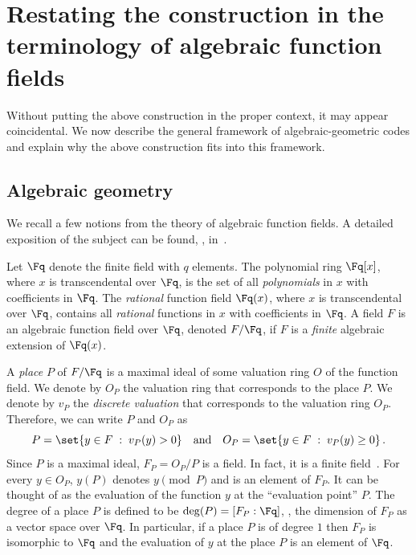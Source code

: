 \section{Restating the construction in the terminology of algebraic function fields}
\label{sec:Restating}

Without putting the above construction in the proper context, it may
appear coincidental. We now describe the general framework of
algebraic-geometric codes and explain why the above construction
fits into this framework.

\subsection{Algebraic geometry}\label{subsec:AG-prel}
We recall a few notions from the theory of algebraic function
fields. A detailed exposition of the subject can be found, \eg,
in~\cite{S:93}.

Let $\Fq $ denote the finite field with $q$ elements. The polynomial
ring $\Fq [x]$, where $x$ is transcendental over $\Fq $, is the set
of all \emph{polynomials} in $x$ with coefficients in $\Fq $. The
\emph{rational} function field $\Fq (x)$, where $x$ is
transcendental over $\Fq $, contains all \emph{rational} functions
in $x$ with coefficients in $\Fq $. A field $F$ is an algebraic
function field over $\Fq$, denoted $F/\Fq $, if $F$ is a
\emph{finite} algebraic extension of $\Fq (x)$.

A \emph{place} $P$ of $F/\Fq $ is a maximal ideal of some valuation
ring $O$ of the function field. We denote by $O_P$ the valuation
ring that corresponds to the place $P$. We denote by $v_P$ the
\emph{discrete valuation} that corresponds to the valuation ring
$O_P$. Therefore, we can write $P$ and $O_P$ as $$P=\set{y \in F \;:\;
v_P(y)  >0}\quad\text{and}\quad O_P=\set{y \in F \;:\; v_P(y) \ge
0}\,.$$ Since $P$ is a maximal ideal, $F_P=O_P/P$ is a field. In fact,
it is a finite field~\cite[Proposition I.1.14]{S:93}. For every $y
\in O_P$, $y(P)$ denotes $y \pmod P$ and is an element of $F_P$. It
can be thought of as the evaluation of the function $y$ at the
``evaluation point'' $P$. The degree of a place $P$ is defined to be
$\deg(P)=[F_P:\Fq ]$, \ie, the dimension of $F_P$ as a vector space
over $\Fq$. In particular, if a place $P$ is of degree $1$ then
$F_P$ is isomorphic to $\Fq$ and the evaluation of $y$ at the place
$P$ is an element of $\Fq$.

